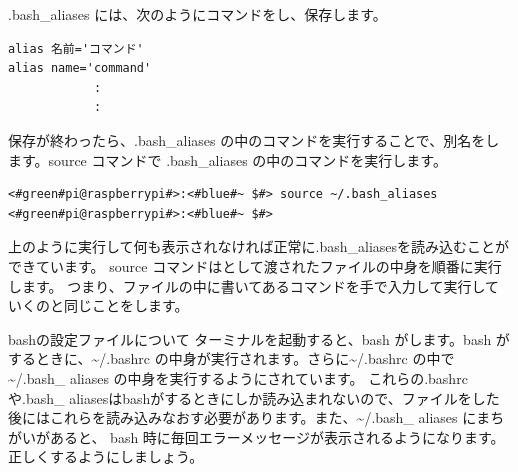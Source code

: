 \documentclass[text03.tex]{subfiles}
\begin{document}
.bash{\_}aliases には、次のようにコマンドをし、保存します。
\begin{lstlisting}[caption=\textasciitilde/.bash\_aliasesの書き方1, label=bashAliasesGrammar1]
alias 名前='コマンド'
alias name='command'
            :
            :
\end{lstlisting}

保存が終わったら、.bash{\_}aliases の中のコマンドを実行することで、別名をします。source コマンドで .bash{\_}aliases の中のコマンドを実行します。
\begin{lstlisting}[caption=\textasciitilde/.bash\_aliasesの読込, label=sourceBashAliases]
<#green#pi@raspberrypi#>:<#blue#~ $#> source ~/.bash_aliases
<#green#pi@raspberrypi#>:<#blue#~ $#>
\end{lstlisting}
上のように実行して何も表示されなければ正常に.bash\_aliasesを読み込むことができています。
source コマンドはとして渡されたファイルの中身を順番に実行します。
つまり、ファイルの中に書いてあるコマンドを手で入力して実行していくのと同じことをします。

\begin{itembox}[c]{bashの設定ファイルについて}
    ターミナルを起動すると、bash がします。bash がするときに、\textasciitilde/.bashrc の中身が実行されます。さらに\textasciitilde/.bashrc の中で \textasciitilde/.bash\_ aliases の中身を実行するようにされています。
    これらの.bashrcや.bash\_ aliasesはbashがするときにしか読み込まれないので、ファイルをした後にはこれらを読み込みなおす必要があります。また、\textasciitilde/.bash\_ aliases にまちがいがあると、
    bash 時に毎回エラーメッセージが表示されるようになります。正しくするようにしましょう。
\end{itembox}

\begin{tcolorbox}[title=\useOmetoi]
    \begin{enumerate}
    \end{enumerate}
\end{tcolorbox}
\end{document}
